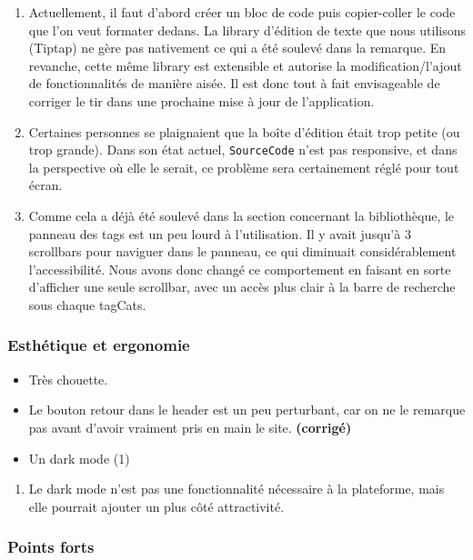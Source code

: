 \bigskip
\begin{enumerate}
    \item Actuellement, il faut d'abord créer un bloc de code puis copier-coller le code que l'on veut formater dedans. La \gls{library} d'édition de texte que nous utilisons (Tiptap) ne gère pas nativement ce qui a été soulevé dans la remarque. En revanche, cette même \gls{library} est extensible et autorise la modification/l'ajout de fonctionnalités de manière aisée. Il est donc tout à fait envisageable de corriger le tir dans une prochaine mise à jour de l'application.
    \item Certaines personnes se plaignaient que la boîte d'édition était trop petite (ou trop grande). Dans son état actuel, \texttt{SourceCode} n'est pas responsive, et dans la perspective où elle le serait, ce problème sera certainement réglé pour tout écran.
    \item Comme cela a déjà été soulevé dans la section concernant la bibliothèque, le panneau des \glspl{tag} est un peu lourd à l'utilisation. Il y avait jusqu'à 3 scrollbars pour naviguer dans le panneau, ce qui diminuait considérablement l'accessibilité. Nous avons donc changé ce comportement en faisant en sorte d'afficher une seule scrollbar, avec un accès plus clair à la barre de recherche sous chaque \glspl{tagCat}.
\end{enumerate}

\subsubsection*{Esthétique et ergonomie}

\begin{itemize}
    \item Très chouette.
    \item Le bouton retour dans le header est un peu perturbant, car on ne le remarque pas avant d'avoir vraiment pris en main le site. \textbf{(corrigé)}
    \item Un dark mode (1)
\end{itemize}
\bigskip
\begin{enumerate}
    \item Le dark mode n'est pas une fonctionnalité nécessaire à la plateforme, mais elle pourrait ajouter un plus côté attractivité.
\end{enumerate}

\subsubsection*{Points forts}

